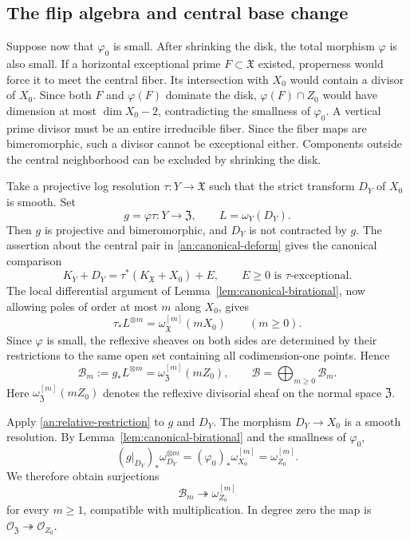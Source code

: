 \documentclass[11pt,a4paper]{article}
\theoremstyle{definition}\newtheorem{definition}[theorem]{Definition}
\theoremstyle{remark}\newtheorem*{remark}{Remark}
\newcommand{\OO}{\mathcal O}
\begin{document}
\subsection{The flip algebra and central base change}

Suppose now that $\varphi_0$ is small. After shrinking the disk,
the total morphism $\varphi$ is also small. If a horizontal
exceptional prime $F\subset\mathfrak X$ existed, properness
would force it to meet the central fiber. Its intersection with
$X_0$ would contain a divisor of $X_0$. Since both $F$ and
$\varphi(F)$ dominate the disk, $\varphi(F)\cap Z_0$ would have dimension at most
$\dim X_0-2$, contradicting the smallness of $\varphi_0$.
A vertical prime divisor must be an entire irreducible fiber.
Since the fiber maps are bimeromorphic, such a divisor cannot be
exceptional either. Components outside the central neighborhood
can be excluded by shrinking the disk.

Take a projective log resolution $\tau:Y\to\mathfrak X$ such
that the strict transform $D_Y$ of $X_0$ is smooth. Set
\[
 g=\varphi\tau:Y\to\mathfrak Z,\qquad L=\omega_Y(D_Y).
\]
Then $g$ is projective and bimeromorphic, and $D_Y$ is not
contracted by $g$. The assertion about the central pair in
\ref{an:canonical-deform} gives the canonical comparison
\begin{equation}\label{eq:family-canonical-pair-comparison}
 K_Y+D_Y=\tau^*(K_{\mathfrak X}+X_0)+E,
 \qquad E\ge0\text{ is }\tau\text{-exceptional}.
\end{equation}
The local differential argument of
Lemma~\ref{lem:canonical-birational}, now allowing poles of order
at most $m$ along $X_0$, gives
\[
 \tau_*L^{\otimes m}=
 \omega_{\mathfrak X}^{[m]}(mX_0)
 \qquad(m\ge0).
\]
Since $\varphi$ is small, the reflexive sheaves on both sides are
determined by their restrictions to the same open set containing
all codimension-one points. Hence
\begin{equation}\label{eq:family-canonical-algebra}
 \mathcal B_m:=g_*L^{\otimes m}
 =\omega_{\mathfrak Z}^{[m]}(mZ_0),
 \qquad \mathcal B=\bigoplus_{m\ge0}\mathcal B_m.
\end{equation}
Here $\omega_{\mathfrak Z}^{[m]}(mZ_0)$ denotes the reflexive
divisorial sheaf on the normal space $\mathfrak Z$.

Apply \ref{an:relative-restriction} to $g$ and $D_Y$.
The morphism $D_Y\to X_0$ is a smooth resolution. By
Lemma~\ref{lem:canonical-birational} and the smallness of
$\varphi_0$,
\[
 (g|_{D_Y})_*\omega_{D_Y}^{\otimes m}
 =(\varphi_0)_*\omega_{X_0}^{[m]}
 =\omega_{Z_0}^{[m]}.
\]
We therefore obtain surjections
\begin{equation}\label{eq:family-algebra-restriction}
 \mathcal B_m\twoheadrightarrow\omega_{Z_0}^{[m]}
\end{equation}
for every $m\ge1$, compatible with multiplication. In degree zero
the map is $\OO_{\mathfrak Z}\twoheadrightarrow\OO_{Z_0}$.
\end{document}
